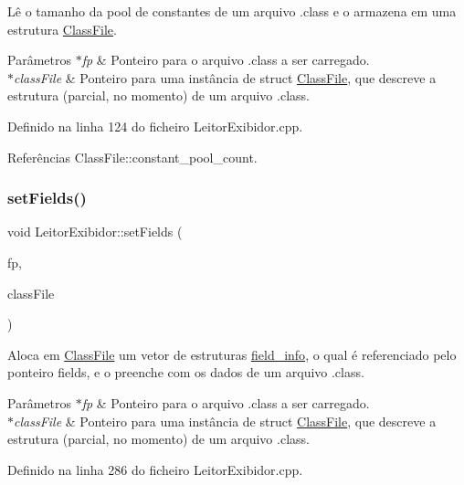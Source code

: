 Lê o tamanho da pool de constantes de um arquivo .class e o armazena em uma estrutura \hyperlink{classClassFile}{Class\+File}. 
\begin{DoxyParams}{Parâmetros}
{\em $\ast$fp} & Ponteiro para o arquivo .class a ser carregado. \\
\hline
{\em $\ast$class\+File} & Ponteiro para uma instância de struct \hyperlink{classClassFile}{Class\+File}, que descreve a estrutura (parcial, no momento) de um arquivo .class. \\
\hline
\end{DoxyParams}


Definido na linha 124 do ficheiro Leitor\+Exibidor.\+cpp.



Referências Class\+File\+::constant\+\_\+pool\+\_\+count.

\mbox{\label{classLeitorExibidor_a682c7ad4fd18b4dce390285c3c643b7b}} 
\subsubsection{\texorpdfstring{set\+Fields()}{setFields()}}
{\footnotesize\ttfamily void Leitor\+Exibidor\+::set\+Fields (\begin{DoxyParamCaption}\item[{F\+I\+LE $\ast$}]{fp,  }\item[{\hyperlink{classClassFile}{Class\+File} $\ast$}]{class\+File }\end{DoxyParamCaption})\hspace{0.3cm}{\ttfamily [private]}}

Aloca em \hyperlink{classClassFile}{Class\+File} um vetor de estruturas \hyperlink{structfield__info}{field\+\_\+info}, o qual é referenciado pelo ponteiro fields, e o preenche com os dados de um arquivo .class. 
\begin{DoxyParams}{Parâmetros}
{\em $\ast$fp} & Ponteiro para o arquivo .class a ser carregado. \\
\hline
{\em $\ast$class\+File} & Ponteiro para uma instância de struct \hyperlink{classClassFile}{Class\+File}, que descreve a estrutura (parcial, no momento) de um arquivo .class. \\
\hline
\end{DoxyParams}


Definido na linha 286 do ficheiro Leitor\+Exibidor.\+cpp.



